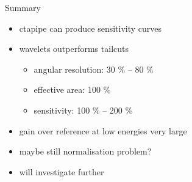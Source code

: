 \documentclass[8pt]{beamer}
\begin{document}
    \begin{frame}{Summary}
        \begin{itemize}
            \item ctapipe can produce sensitivity curves
            \item wavelets outperforms tailcuts
            \begin{itemize}
                \item angular resolution: 30 \% -- 80 \%
                \item effective area: 100 \%
                \item sensitivity: 100 \% -- 200 \%
            \end{itemize}
            \item gain over reference at low energies very large
            \item maybe still normalisation problem?
            \item will investigate further

        \end{itemize}

    \end{frame}
\end{document}
